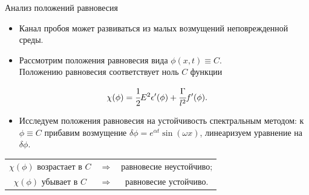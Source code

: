 \begin{frame}{Анализ положений равновесия}
\begin{itemize}
	\item Канал пробоя может развиваться из малых возмущений неповрежденной среды.
	\item Рассмотрим положения равновесия вида $\phi(x, t) \equiv C$. \\
	Положению равновесия соответствует ноль $C$ функции
\end{itemize}
\[
	\chi(\phi) = \cfrac{1}{2} E^2 \epsilon'(\phi) + \cfrac{\Gamma}{l^2} f'(\phi).
\]
\vspace{-0.5cm}
\begin{itemize}
	\item Исследуем положения равновесия на устойчивость спектральным методом: к $\phi \equiv C$ прибавим возмущение $\delta \phi = e^{\alpha t} \sin(\omega x)$, линеаризуем уравнение на $\delta \phi$.
\end{itemize}
\begin{center}
\begin{tabular}{c c c}
	$\chi(\phi)$ возрастает в $C$ & $\Longrightarrow$ & равновесие неустойчиво; \\
	$\chi(\phi)$ убывает в $C$ & $\Longrightarrow$ & равновесие устойчиво.
\end{tabular}
\end{center}
\end{frame}


